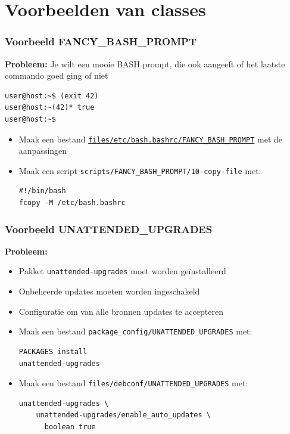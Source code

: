 \documentclass{beamer}
\begin{document}
\section{Voorbeelden van classes}


\begin{frame}[fragile]
\frametitle{Voorbeeld FANCY\_BASH\_PROMPT}
\textbf{Probleem:} 
Je wilt een mooie BASH prompt, die ook aangeeft of het laatste commando goed ging of niet
\begin{verbatim}
user@host:~$ (exit 42)
user@host:~(42)* true
user@host:~$
\end{verbatim}

 

\begin{itemize}
  \item<4-> Maak een bestand \href{https://github.com/slspeek/fai/blob/main/files/etc/bash.bashrc/FANCY_BASH_PROMPT}{\texttt{files/etc/bash.bashrc/FANCY\_BASH\_PROMPT}} met de aanpassingen
  \item<5-> Maak een script \texttt{scripts/FANCY\_BASH\_PROMPT/10-copy-file} met:
  \begin{verbatim}#!/bin/bash
fcopy -M /etc/bash.bashrc
  \end{verbatim} 
   
\end{itemize}
\end{frame}

\begin{frame}[fragile]
\frametitle{Voorbeeld UNATTENDED\_UPGRADES}
 
\textbf{Probleem:} 
\begin{itemize}
  \item Pakket \texttt{unattended-upgrades} moet worden geïnstalleerd
  \item Onbeheerde updates moeten worden ingeschakeld
  \item Configuratie om van alle bronnen updates te accepteren
\end{itemize}

\begin{itemize}
  \item<2-> Maak een bestand \texttt{package\_config/UNATTENDED\_UPGRADES} met:
  \begin{verbatim}PACKAGES install
unattended-upgrades
  \end{verbatim} 
  \item<3-> Maak een bestand \texttt{files/debconf/UNATTENDED\_UPGRADES} met:
  \begin{verbatim}unattended-upgrades \
    unattended-upgrades/enable_auto_updates \
      boolean true
  \end{verbatim}
\end{itemize}
\end{frame}
\end{document}
